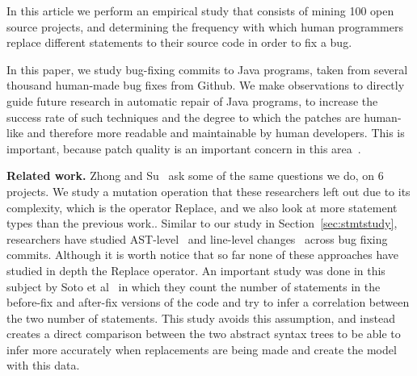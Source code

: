 \documentclass{sig-alternate-05-2015}
\begin{document}
In this article we perform an empirical study that consists of mining 100 open source projects, and determining the frequency with which human programmers replace different statements to their source code in order to fix a bug.



In this paper, we study bug-fixing commits to Java programs, 
taken from several thousand human-made bug fixes from Github. We make
observations to directly guide future research in automatic repair of Java
programs, to increase the success rate of such techniques and the degree to
which the patches are human-like and therefore more readable and maintainable by
human developers. This is important, because patch quality is an important
concern in this area~\cite{Qi15}.


\vspace{1ex} \noindent\textbf{Related work.} Zhong and Su~\cite{zhong2015} ask
some of the same questions we do, on 6 projects. We study a mutation operation that these researchers left out due to its complexity, which is the operator Replace, and we also look at more statement types than the previous work.. Similar to our study in
Section~\ref{sec:stmtstudy}, researchers have 
studied AST-level~\cite{Martinez:2015ez} and line-level
changes~\cite{Asaduzzaman:2013df} across bug fixing commits.
Although it is worth notice that so far none of these approaches have studied in depth the Replace operator.
An important study was done in this subject by Soto et al~\cite{soto} in which they count the number of statements in the before-fix and after-fix versions of the code and try to infer a correlation between the two number of statements. This study avoids this assumption, and instead creates a direct comparison between the two abstract syntax trees to be able to infer more accurately when replacements are being made and create the model with this data.
\end{document}
